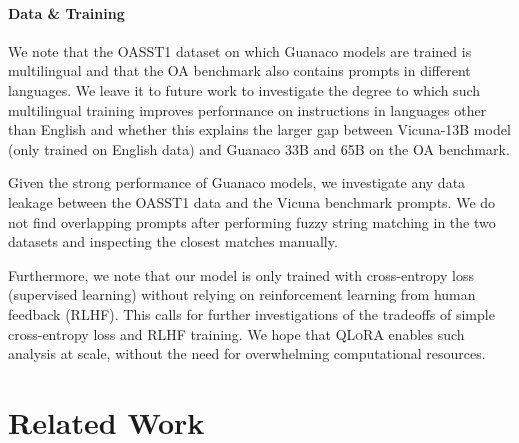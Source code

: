 \documentclass{article}
\newcommand{\method}{\textsc{QLoRA}\xspace}
\newcommand{\model}{{Guanaco}\xspace}
\begin{document}
\paragraph{Data \& Training}
We note that the OASST1 dataset  on which \model models are trained is multilingual and that the OA benchmark also contains prompts in different languages. We leave it to future work to investigate the degree to which such multilingual training improves performance on instructions in languages other than English and whether this explains the larger gap between Vicuna-13B model (only trained on English data) and \model 33B and 65B on the OA benchmark.

Given the strong performance of \model models, we investigate any data leakage between the OASST1 data and the Vicuna benchmark prompts. We do not find overlapping prompts after performing fuzzy string matching in the two datasets and inspecting the closest matches manually.

Furthermore, we note that our model is only trained with cross-entropy loss (supervised learning) without relying on reinforcement learning from human feedback (RLHF). This calls for further investigations of the tradeoffs of simple cross-entropy loss and RLHF training. We hope that \method enables such analysis at scale, without the need for overwhelming computational resources.

\section{Related Work}

\end{document}

